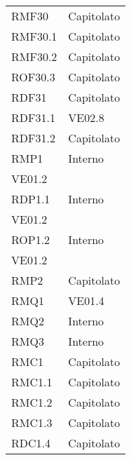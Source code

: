 \begin{longtable}[h!] { >{\centering}m{5cm} >{\centering}m{5cm} }
	\tabularnewline
	RMF30 & Capitolato
	\tabularnewline
	RMF30.1 & Capitolato
	\tabularnewline
	RMF30.2 & Capitolato
	\tabularnewline
	ROF30.3 & Capitolato
	\tabularnewline
	RDF31 & Capitolato
	\tabularnewline
	RDF31.1 & VE02.8
	\tabularnewline
	RDF31.2 & Capitolato
	\tabularnewline
	RMP1 & Interno\\VE01.2
	\tabularnewline
	RDP1.1 & Interno\\VE01.2
	\tabularnewline
	ROP1.2 & Interno\\VE01.2
	\tabularnewline
	RMP2 & Capitolato
	\tabularnewline
	RMQ1 & VE01.4
	\tabularnewline
	RMQ2 & Interno
	\tabularnewline
	RMQ3 & Interno
	\tabularnewline
	RMC1 & Capitolato
	\tabularnewline
	RMC1.1 & Capitolato
	\tabularnewline
	RMC1.2 & Capitolato
	\tabularnewline
	RMC1.3 & Capitolato
	\tabularnewline
	RDC1.4 & Capitolato
	\tabularnewline

\end{longtable}

